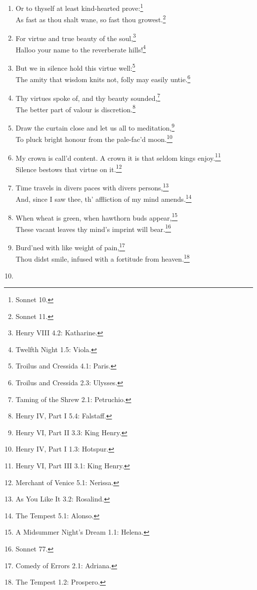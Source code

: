 \documentclass[17pt,twoside]{extarticle}
\begin{document}
\begin{enumerate}
{    1.5: Viola.}\\`There are occasions and causes, why and wherefore in
  all things!' \footnote{Henry V 5.1: Fluellen. ``Is'' changed to
    ``are''.}
\item
  Or to thyself at least kind-hearted prove:\footnote{Sonnet 10.}\\As
  fast as thou shalt wane, so fast thou growest.\footnote{Sonnet 11.}
\item
  For virtue and true beauty of the soul,\footnote{Henry VIII 4.2:
    Katharine.}\\Halloo your name to the reverberate hills!\footnote{Twelfth
    Night 1.5: Viola.}
\item
  But we in silence hold this virtue well:\footnote{Troilus and Cressida
    4.1: Paris.}\\The amity that wisdom knits not, folly may easily
  untie.\footnote{Troilus and Cressida 2.3: Ulysses.}
\item
  Thy virtues spoke of, and thy beauty sounded,\footnote{Taming of the
    Shrew 2.1: Petruchio.}\\The better part of valour is
  discretion.\footnote{Henry IV, Part I 5.4: Falstaff.}
\item
  Draw the curtain close and let us all to meditation,\footnote{Henry
    VI, Part II 3.3: King Henry.}\\To pluck bright honour from the
  pale-fac'd moon.\footnote{Henry IV, Part I 1.3: Hotspur.}
\item
  My crown is call'd content. A crown it is that seldom kings
  enjoy.\footnote{Henry VI, Part III 3.1: King Henry.}\\Silence bestows
  that virtue on it.\footnote{Merchant of Venice 5.1: Nerissa.}
\item
  Time travels in divers paces with divers persons,\footnote{As You Like
    It 3.2: Rosalind.}\\And, since I saw thee, th' affliction of my mind
  amends.\footnote{The Tempest 5.1: Alonso.}
\item
  When wheat is green, when hawthorn buds appear,\footnote{A Midsummer
    Night's Dream 1.1: Helena.}\\These vacant leaves thy mind's imprint
  will bear.\footnote{Sonnet 77.}
\item
  Burd'ned with like weight of pain,\footnote{Comedy of Errors 2.1:
    Adriana.}\\Thou didst smile, infused with a fortitude from
  heaven.\footnote{The Tempest 1.2: Prospero.}
\item

\end{enumerate}
\end{document}
